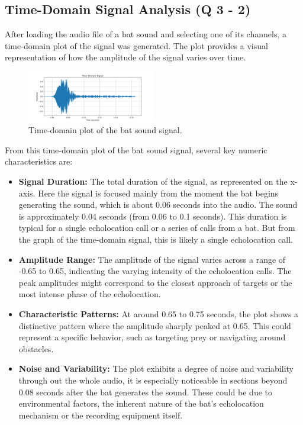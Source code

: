 \documentclass[twocolumn]{article}[ht]
\begin{document}
\subsection{Time-Domain Signal Analysis (Q 3 - 2)}
After loading the audio file of a bat sound and selecting one of its channels, a time-domain plot of the signal was generated. The plot provides a visual representation of how the amplitude of the signal varies over time.

\begin{figure}[ht]
    \centering
    \includegraphics[width=0.5\textwidth]{time_domain_signal_plot.png}
    \caption{Time-domain plot of the bat sound signal.}
\end{figure}

From this time-domain plot of the bat sound signal, several key numeric characteristics are:

\begin{itemize}
    \item \textbf{Signal Duration:} The total duration of the signal, as represented on the x-axis. Here the signal is focused mainly from the moment the bat begins generating the sound, which is about 0.06 seconds into the audio. The sound is approximately 0.04 seconds (from 0.06 to 0.1 seconds). This duration is typical for a single echolocation call or a series of calls from a bat. But from the graph of the time-domain signal, this is likely a single echolocation call.
    
    \item \textbf{Amplitude Range:} The amplitude of the signal varies across a range of -0.65 to 0.65, indicating the varying intensity of the echolocation calls. The peak amplitudes might correspond to the closest approach of targets or the most intense phase of the echolocation.
    
    \item \textbf{Characteristic Patterns:} At around 0.65 to 0.75 seconds, the plot shows a distinctive pattern where the amplitude sharply peaked at 0.65. This could represent a specific behavior, such as targeting prey or navigating around obstacles.
    
    \item \textbf{Noise and Variability:} The plot exhibits a degree of noise and variability through out the whole audio, it is especially noticeable in sections beyond 0.08 seconds after the bat generates the sound. These could be due to environmental factors, the inherent nature of the bat's echolocation mechanism or the recording equipment itself.

\end{itemize}
\end{document}
